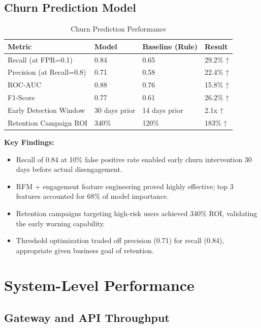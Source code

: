 \documentclass[12pt,a4paper]{report}
\begin{document}
\begin{itemize}
\subsection{Churn Prediction Model}

\begin{table}[H]
\centering
\caption{Churn Prediction Performance}
\begin{tabular}{p{3cm} p{2cm} p{2cm} p{2cm}}
\toprule
\textbf{Metric} & \textbf{Model} & \textbf{Baseline (Rule)} & \textbf{Result} \\
\midrule
Recall (at FPR=0.1) & 0.84 & 0.65 & 29.2\% ↑ \\
Precision (at Recall=0.8) & 0.71 & 0.58 & 22.4\% ↑ \\
ROC-AUC & 0.88 & 0.76 & 15.8\% ↑ \\
F1-Score & 0.77 & 0.61 & 26.2\% ↑ \\
Early Detection Window & 30 days prior & 14 days prior & 2.1x ↑ \\
Retention Campaign ROI & 340\% & 120\% & 183\% ↑ \\
\bottomrule
\end{tabular}
\end{table}

\textbf{Key Findings:}
\begin{itemize}
    \item Recall of 0.84 at 10\% false positive rate enabled early churn intervention 30 days before actual disengagement.
    \item RFM + engagement feature engineering proved highly effective; top 3 features accounted for 68\% of model importance.
    \item Retention campaigns targeting high-risk users achieved 340\% ROI, validating the early warning capability.
    \item Threshold optimization traded off precision (0.71) for recall (0.84), appropriate given business goal of retention.
\end{itemize}

\section{System-Level Performance}

\subsection{Gateway and API Throughput}


\end{itemize}
\end{document}
